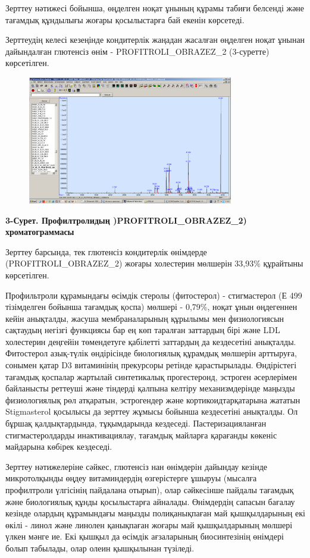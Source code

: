 Зерттеу нәтижесі бойынша, өңделген ноқат ұнының құрамы табиғи белсенді
және тағамдық құндылығы жоғары қосылыстарға бай екенін көрсетеді.

Зерттеудің келесі кезеңінде кондитерлік жаңадан жасалған өңделген ноқат
ұнынан дайындалған глютенсіз өнім - PROFITROLI\_OBRAZEZ\_2 (3-суретте)
көрсетілген.

\begin{figure}[H]
	\centering
	\includegraphics[width=0.8\textwidth]{media/pish/image15}
	\caption*{}
\end{figure}


{\bfseries 3-Сурет. Профилтролидың )PROFITROLI\_OBRAZEZ\_2)
хроматограммасы}

Зерттеу барсында, тек глютенсіз кондитерлік өнімдерде
(PROFITROLI\_OBRAZEZ\_2) жоғары холестерин мөлшерін 33,93\% құрайтыны
көрсетілген.

Профильтроли құрамындағы өсімдік стеролы (фитостерол) - стигмастерол (Е
499 тізімделген бойынша тағамдық қоспа) мөлшері - 0,79\%, ноқат ұнын
өңдегеннен кейін анықталды, жасуша мембраналарының құрылымы мен
физиологиясын сақтаудың негізгі функциясы бар ең көп таралған заттардың
бірі және LDL холестерин деңгейін төмендетуге қабілетті заттардың да
кездесетіні анықталды. Фитостерол азық-түлік өндірісінде биологиялық
құрамдық мөлшерін арттыруға, сонымен қатар D3 витаминінің прекурсоры
ретінде қарастырылады. Өндірістегі тағамдық қоспалар жартылай
синтетикалық прогестеронд, эстроген әсерлерімен байланысты реттеуші және
тіндерді қалпына келтіру механизмдерінде маңызды физиологиялық рөл
атқаратын, эстрогендер және кортикоидтарқатарына жататын Stigmasterol
қосылысы да зерттеу жұмысы бойынша кездесетіні анықталды. Ол бұршақ
қалдықтардында, тұқымдарында кездеседі. Пастеризацияланған
стигмастеролдарды инактивациялау, тағамдық майларға қарағанды көкеніс
майдарына көбiрек кездеседі.

Зерттеу нәтижелеріне сәйкес, глютенсіз нан өнімдерін дайындау кезінде
микротолқынды өңдеу витаминдердің өзгерістерге ұшыруы (мысалға
профилтроли үлгісінің пайдалана отырып), олар сәйкесінше пайдалы
тағамдық және биологиялық құнды қосылыстарға айналады. Өнімдердің
сапасын бағалау кезінде олардың құрамындағы маңызды полиқанықпаған май
қышқылдарының екі өкілі - линол және линолен қанықпаған жоғары май
қышқылдарының мөлшері үлкен мәнге ие. Екі қышқыл да өсімдік ағзаларының
биосинтезінің өнімдері болып табылады, олар олеин қышқылынан түзіледі.

